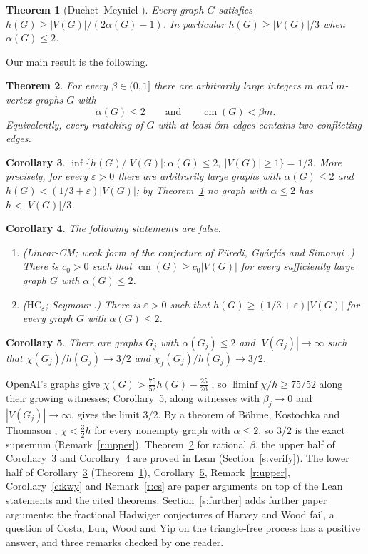 \documentclass[11pt]{article}
\newtheorem{theorem}{Theorem}[section]
\newtheorem{corollary}[theorem]{Corollary}
\theoremstyle{definition}\newtheorem{conjecture}[theorem]{Conjecture}
\theoremstyle{remark}\newtheorem{remark}[theorem]{Remark}
\newcommand{\cm}{\operatorname{cm}}
\newcommand{\eps}{\varepsilon}
\begin{document}
\begin{theorem}[Duchet--Meyniel \cite{DM}]\label{t:dm}
Every graph $G$ satisfies $h(G)\ge |V(G)|/(2\alpha(G)-1)$. In particular $h(G)\ge|V(G)|/3$ when $\alpha(G)\le2$.
\end{theorem}

Our main result is the following.

\begin{theorem}\label{t:main}
For every $\beta\in(0,1]$ there are arbitrarily large integers $m$ and $m$-vertex graphs $G$ with
\[
 \alpha(G)\le2\qquad\text{and}\qquad \cm(G)<\beta m .
\]
Equivalently, every matching of $G$ with at least $\beta m$ edges contains two conflicting edges.
\end{theorem}

\begin{corollary}\label{c:third}
$\inf\{h(G)/|V(G)|:\alpha(G)\le2,\ |V(G)|\ge1\}=1/3$. More precisely, for every $\eps>0$ there are arbitrarily large graphs with
$\alpha(G)\le2$ and $h(G)<(1/3+\eps)|V(G)|$; by Theorem~\ref{t:dm} no graph with $\alpha\le2$ has $h<|V(G)|/3$.
\end{corollary}

\begin{corollary}\label{c:conj}
The following statements are false.
\begin{enumerate}
\item[(i)] (Linear-CM; weak form of the conjecture of F\"uredi, Gy\'arf\'as and Simonyi \cite{FGS}.) There is $c_0>0$ such
that $\cm(G)\ge c_0|V(G)|$ for every sufficiently large graph $G$ with $\alpha(G)\le2$.
\item[(ii)] ($\mathrm{HC}_\eps$; Seymour \cite{Sey}.) There is $\eps>0$ such that $h(G)\ge(1/3+\eps)|V(G)|$ for every graph
$G$ with $\alpha(G)\le2$.
\end{enumerate}
\end{corollary}

\begin{corollary}\label{c:ratio}
There are graphs $G_j$ with $\alpha(G_j)\le2$ and $|V(G_j)|\to\infty$ such that $\chi(G_j)/h(G_j)\to3/2$ and
$\chi_f(G_j)/h(G_j)\to3/2$.
\end{corollary}

OpenAI's graphs give $\chi(G)>\frac{75}{52}h(G)-\frac{25}{26}$ \cite[cor:hadwiger]{OAIH}, so $\liminf\chi/h\ge75/52$
along their growing witnesses; Corollary~\ref{c:ratio}, along witnesses with $\beta_j\to0$ and $|V(G_j)|\to\infty$, gives
the limit $3/2$. By a theorem of B\"ohme, Kostochka and Thomason \cite{BKT}, $\chi<\frac32h$ for every nonempty graph
with $\alpha\le2$, so $3/2$ is the exact supremum (Remark~\ref{r:upper}). Theorem~\ref{t:main} for rational $\beta$, the
upper half of Corollary~\ref{c:third} and Corollary~\ref{c:conj} are proved in Lean (Section~\ref{s:verify}). The lower
half of Corollary~\ref{c:third} (Theorem~\ref{t:dm}), Corollary~\ref{c:ratio}, Remark~\ref{r:upper},
Corollary~\ref{c:kwy} and Remark~\ref{r:cs} are paper arguments on top of the Lean statements and the cited theorems.
Section~\ref{s:further} adds further paper arguments: the fractional Hadwiger conjectures of Harvey and Wood fail, a question
of Costa, Luu, Wood and Yip on the triangle-free process has a positive answer, and three remarks checked by one reader.
\end{document}

